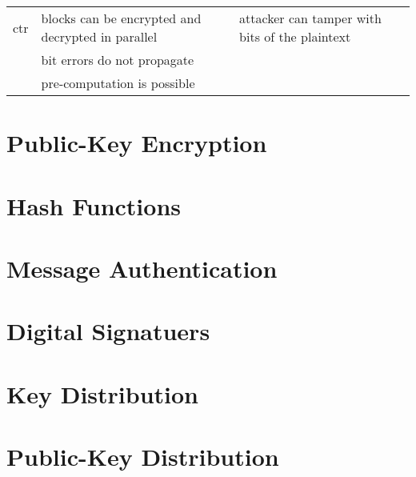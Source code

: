 \documentclass[draft]{article}
\begin{document}
\begin{center}
\begin{tabular}{lp{}p{}}
        \acrshort{ctr}                  & blocks can be encrypted and decrypted in parallel    & attacker can tamper with bits of the plaintext                       \\\cmidrule{2-3}
                                        & bit errors do not propagate                          &                                                                      \\\cmidrule{2-2}
                                        & pre-computation is possible                          &                                                                      \\\bottomrule
    \end{tabular}
\end{center}
\section{Public-Key Encryption}

\section{Hash Functions}
\section{Message Authentication}
\section{Digital Signatuers}
\section{Key Distribution}
\section{Public-Key Distribution}
\clearpage

\glsaddall
\printglossary[nonumberlist]
\printglossary[nonumberlist,type=\acronymtype]
\end{document}
